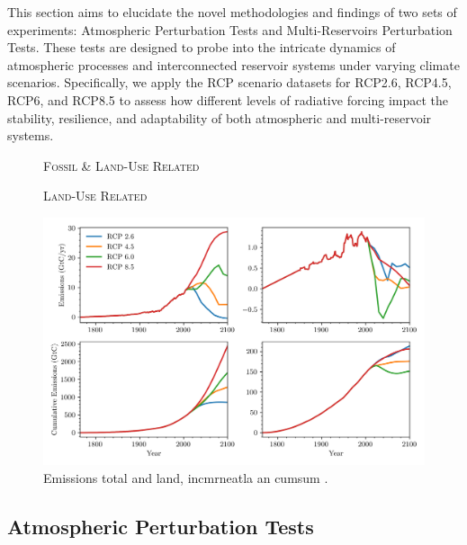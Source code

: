 \documentclass[11pt, a4paper, pdftex, twoside, dvipsnames]{article}
\begin{document}
 This section aims to elucidate the novel methodologies and findings of two sets of experiments: Atmospheric Perturbation Tests and Multi-Reservoirs Perturbation Tests. These tests are designed to probe into the intricate dynamics of atmospheric processes and interconnected reservoir systems under varying climate scenarios. Specifically, we apply the RCP scenario datasets for RCP2.6, RCP4.5, RCP6, and RCP8.5 to assess how different levels of radiative forcing impact the stability, resilience, and adaptability of both atmospheric and multi-reservoir systems.
% 
\begin{figure}[b]
\noindent %
\begin{minipage}{0.5\textwidth}
	\noindent
	\centering
	\hspace{3em}\small{\textsc{Fossil \& Land-Use Related}}
\end{minipage}%
\begin{minipage}{0.5\textwidth}
	\noindent
	\centering
	\small{\textsc{Land-Use Related}}
\end{minipage}
    \includegraphics[width=\textwidth]{fig/simulations_RCP}
    \caption{
    Emissions total and land, incmrneatla an cumsum .
     }
    \label{fig:rcp}
\end{figure}
%
 
 \subsection{Atmospheric Perturbation Tests}
\lipsum[1][1-10] 
%
\end{document}
